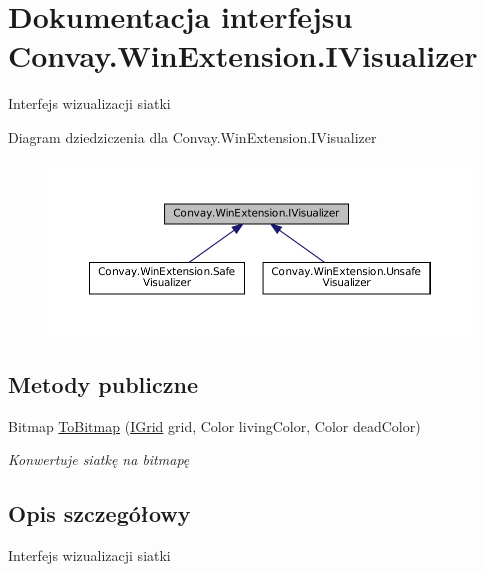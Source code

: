\hypertarget{interface_convay_1_1_win_extension_1_1_i_visualizer}{}\section{Dokumentacja interfejsu Convay.\+Win\+Extension.\+I\+Visualizer}
\label{interface_convay_1_1_win_extension_1_1_i_visualizer}


Interfejs wizualizacji siatki  




Diagram dziedziczenia dla Convay.\+Win\+Extension.\+I\+Visualizer
\nopagebreak
\begin{figure}[H]
\begin{center}
\leavevmode
\includegraphics[width=350pt]{interface_convay_1_1_win_extension_1_1_i_visualizer__inherit__graph}
\end{center}
\end{figure}
\subsection*{Metody publiczne}
\begin{DoxyCompactItemize}
\item 
Bitmap \hyperlink{interface_convay_1_1_win_extension_1_1_i_visualizer_a17c620a076c165286065546a87165dea}{To\+Bitmap} (\hyperlink{interface_convay_1_1_core_1_1_interfaces_1_1_i_grid}{I\+Grid} grid, Color living\+Color, Color dead\+Color)
\begin{DoxyCompactList}\small\item\em Konwertuje siatkę na bitmapę \end{DoxyCompactList}\end{DoxyCompactItemize}


\subsection{Opis szczegółowy}
Interfejs wizualizacji siatki 



